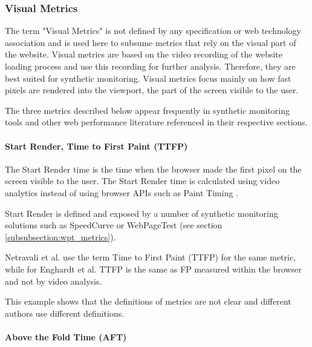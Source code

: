 
\subsubsection{Visual Metrics} %
\label{subsubsection:visual_metrics}

The term "Visual Metrics" is not defined by any specification or web technology association and is used here to subsume metrics that rely on the visual part of the website.
Visual metrics are based on the video recording of the website loading process and use this recording for further analysis.
Therefore, they are best suited for synthetic monitoring.
Visual metrics focus mainly on how fast pixels are rendered into the viewport, the part of the screen visible to the user.

The three metrics described below appear frequently in synthetic monitoring tools and other web performance literature referenced in their respective sections.



\paragraph{Start Render, Time to First Paint (TTFP)} %

The Start Render time is the time when the browser made the first pixel on the screen visible to the user.
The Start Render time is calculated using video analytics instead of using browser APIs such as Paint Timing \cite{2019Schapira}.

Start Render is defined and exposed by a number of synthetic monitoring solutions such as SpeedCurve \cite{2021Souders} or WebPageTest (see section \ref{subsubsection:wpt_metrics}).

Netravali et al. \cite{2018Netravali} use the term Time to First Paint (TTFP) for the same metric,
while for Enghardt et al. \cite{2019Enghardt} TTFP is the same as FP measured within the browser and not by video analysis.

This example shows that the definitions of metrics are not clear and different authors use different definitions.



\paragraph{Above the Fold Time (AFT)} %

